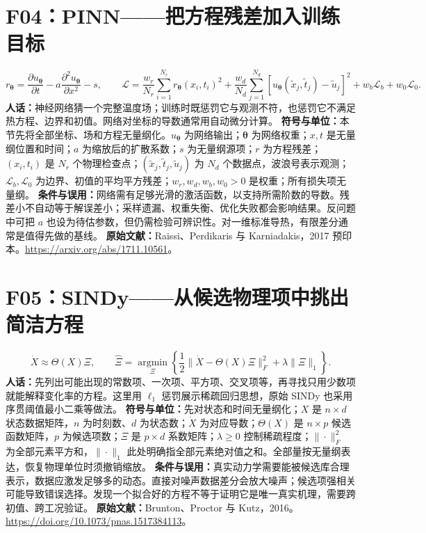 \section{F04：PINN——把方程残差加入训练目标}
\begin{equation}
 r_{\boldsymbol\theta}=\frac{\partial u_{\boldsymbol\theta}}{\partial t}
 -a\frac{\partial^2u_{\boldsymbol\theta}}{\partial x^2}-s,\qquad
 \mathcal L=\frac{w_r}{N_r}\sum_{i=1}^{N_r}r_{\boldsymbol\theta}(x_i,t_i)^2
 +\frac{w_d}{N_d}\sum_{j=1}^{N_d}\left[u_{\boldsymbol\theta}(\tilde x_j,\tilde t_j)-\tilde u_j\right]^2
 +w_b\mathcal L_b+w_0\mathcal L_0.
\end{equation}
\textbf{人话：}神经网络猜一个完整温度场；训练时既惩罚它与观测不符，也惩罚它不满足热方程、边界和初值。网络对坐标的导数通常用自动微分计算。
\textbf{符号与单位：}本节先将全部坐标、场和方程无量纲化。$u_{\boldsymbol\theta}$ 为网络输出；$\boldsymbol\theta$ 为网络权重；$x,t$ 是无量纲位置和时间；$a$ 为缩放后的扩散系数；$s$ 为无量纲源项；$r$ 为方程残差；$(x_i,t_i)$ 是 $N_r$ 个物理检查点；$(\tilde x_j,\tilde t_j,\tilde u_j)$ 为 $N_d$ 个数据点，波浪号表示观测；$\mathcal L_b,\mathcal L_0$ 为边界、初值的平均平方残差；$w_r,w_d,w_b,w_0>0$ 是权重；所有损失项无量纲。
\textbf{条件与误用：}网络需有足够光滑的激活函数，以支持所需阶数的导数。残差小不自动等于解误差小；采样遗漏、权重失衡、优化失败都会影响结果。反问题中可把 $a$ 也设为待估参数，但仍需检验可辨识性。对一维标准导热，有限差分通常是值得先做的基线。
\textbf{原始文献：}Raissi、Perdikaris 与 Karniadakis，2017 预印本。\url{https://arxiv.org/abs/1711.10561}。

\section{F05：SINDy——从候选物理项中挑出简洁方程}
\begin{equation}
 \dot X\approx\Theta(X)\Xi,\qquad
 \hat\Xi=\underset{\Xi}{\operatorname{argmin}}
 \left\{\frac12\|\dot X-\Theta(X)\Xi\|_F^2+\lambda\|\Xi\|_1\right\}.
\end{equation}
\textbf{人话：}先列出可能出现的常数项、一次项、平方项、交叉项等，再寻找只用少数项就能解释变化率的方程。这里用 $\ell_1$ 惩罚展示稀疏回归思想，原始 SINDy 也采用序贯阈值最小二乘等做法。
\textbf{符号与单位：}先对状态和时间无量纲化；$X$ 是 $n\times d$ 状态数据矩阵，$n$ 为时刻数、$d$ 为状态数；$\dot X$ 为对应导数；$\Theta(X)$ 是 $n\times p$ 候选函数矩阵，$p$ 为候选项数；$\Xi$ 是 $p\times d$ 系数矩阵；$\lambda\ge0$ 控制稀疏程度；$\|\cdot\|_F^2$ 为全部元素平方和，$\|\cdot\|_1$ 此处明确指全部元素绝对值之和。全部量按无量纲表达，恢复物理单位时须撤销缩放。
\textbf{条件与误用：}真实动力学需要能被候选库合理表示，数据应激发足够多的动态。直接对噪声数据差分会放大噪声；候选项强相关可能导致错误选择。发现一个拟合好的方程不等于证明它是唯一真实机理，需要跨初值、跨工况验证。
\textbf{原始文献：}Brunton、Proctor 与 Kutz，2016。\url{https://doi.org/10.1073/pnas.1517384113}。

